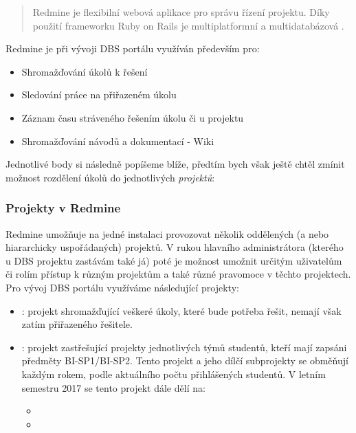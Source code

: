 \begin{quote}
Redmine je flexibilní webová aplikace pro správu řízení projektu. Díky použití frameworku Ruby on Rails je multiplatformní a multidatabázová \cite{redmine}.
\end{quote}

Redmine je při vývoji DBS portálu využíván především pro:
\begin{itemize}
	\item Shromažďování úkolů k řešení
	\item Sledování práce na přiřazeném úkolu
	\item Záznam času stráveného řešením úkolu či u projektu
	\item Shromažďování návodů a dokumentací - Wiki
\end{itemize}
Jednotlivé body si následně popíšeme blíže, předtím bych však ještě chtěl zmínit možnost rozdělení úkolů do jednotlivých \emph{projektů}:

\subsubsection{Projekty v Redmine} \label{if:redmine:projects}

Redmine umožňuje na jedné instalaci provozovat několik oddělených (a nebo hiararchicky uspořádaných) projektů. V rukou hlavního administrátora (kterého u DBS projektu zastávám také já) poté je možnost umožnit určitým uživatelům či rolím přístup k různým projektům a také různé pravomoce v těchto projektech.\\
Pro vývoj DBS portálu využíváme následující projekty:
\begin{itemize}
	\item {}: projekt shromažďující veškeré úkoly, které bude potřeba řešit, nemají však zatím přiřazeného řešitele.
	\item {}: projekt zastřešující projekty jednotlivých týmů studentů, kteří mají zapsáni předměty BI-SP1/BI-SP2. Tento projekt a jeho dílčí subprojekty se obměňují každým rokem, podle aktuálního počtu přihlášených studentů. V letním semestru 2017 se tento projekt dále dělí na:
	\begin{itemize}
		\item {}
		\item {}
	\end{itemize}
\end{itemize}

